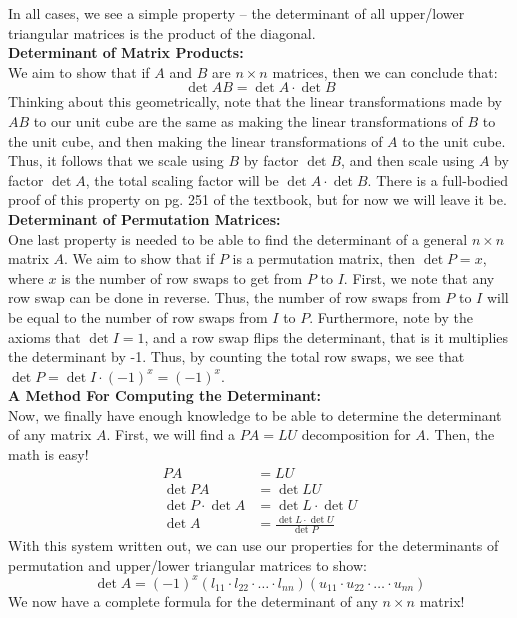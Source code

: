 \documentclass[12pt]{amsart}
\begin{document}
In all cases, we see a simple property -- the determinant of all upper/lower triangular matrices is the product of the diagonal.
\\
\textbf{Determinant of Matrix Products:}\\
We aim to show that if $A$ and $B$ are $n \times n$ matrices, then we can conclude that:
\[\det AB = \det A \cdot \det B\]
Thinking about this geometrically, note that the linear transformations made by $AB$ to our unit cube are the same as making the linear transformations of $B$ to the unit cube, and then making the linear transformations of $A$ to the unit cube. Thus, it follows that we scale using $B$ by factor $\det B$, and then scale using $A$ by factor $\det A$, the total scaling factor will be $\det A \cdot \det B$. There is a full-bodied proof of this property on pg. 251 of the textbook, but for now we will leave it be.\\

\textbf{Determinant of Permutation Matrices:}\\
One last property is needed to be able to find the determinant of a general $n \times n$ matrix $A$. We aim to show that if $P$ is a permutation matrix, then $\det P = x$, where $x$ is the number of row swaps to get from $P$ to $I$. First, we note that any row swap can be done in reverse. Thus, the number of row swaps from $P$ to $I$ will be equal to the number of row swaps from $I$ to $P$. Furthermore, note by the axioms that $\det I = 1$, and a row swap flips the determinant, that is it multiplies the determinant by -1. Thus, by counting the total row swaps, we see that $\det P = \det I \cdot (-1)^x = (-1)^x$.\\

\textbf{A Method For Computing the Determinant:}\\
Now, we finally have enough knowledge to be able to determine the determinant of any matrix $A$. First, we will find a $PA=LU$ decomposition for $A$. Then, the math is easy!
\begin{align*}
	PA &= LU\\
	\det PA &= \det LU\\
	\det P \cdot \det A &= \det L \cdot \det U\\
	\det A &= \frac{\det L \cdot \det U}{\det P}
\end{align*}
With this system written out, we can use our properties for the determinants of permutation and upper/lower triangular matrices to show:
 \[\det A = (-1)^x(l_{11} \cdot l_{22} \cdot \dots \cdot l_{nn})(u_{11} \cdot u_{22} \cdot \dots \cdot u_{nn})\]
We now have a complete formula for the determinant of any $n \times n$ matrix!
\end{document}
